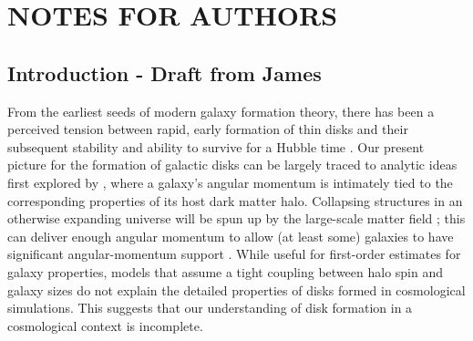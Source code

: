 \documentclass[fleqn,usenatbib]{mnras}
\begin{document}


\section{NOTES FOR AUTHORS}

\subsection{Introduction - Draft from James}

From the earliest seeds of modern galaxy formation theory, there has been a perceived tension between rapid, early formation of thin disks \citep{eggen1962} and their subsequent stability and ability to survive for a Hubble time \citep{ostriker1973,toth1992}.  Our present picture for the formation of galactic disks  can be largely traced to analytic ideas first explored by \citet{fall1980}, where a galaxy's angular momentum is intimately tied to the corresponding properties of its host dark matter halo.  Collapsing structures in an otherwise expanding universe will be spun up by the large-scale matter field \citep{Peebles69};  this can deliver enough angular momentum to allow (at least some) galaxies to have significant angular-momentum support \citep[e.g.][]{MMW98}. While useful for first-order estimates for galaxy properties, models that assume a tight coupling between halo spin and galaxy sizes do not explain the detailed properties of disks formed in cosmological simulations\citep[e.g.][]{GK18}.  This suggests that our understanding of disk formation in a cosmological context is incomplete. 
\end{document}
